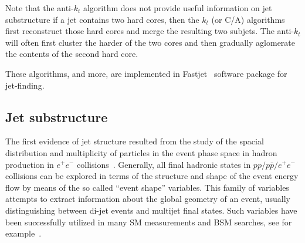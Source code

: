 Note that the anti-$k_t$ algorithm does not provide useful information on jet substructure if a jet contains two hard cores, then the $k_t$ (or C/A) algorithms first reconstruct those hard cores and merge the resulting two subjets. The anti-$k_t$ will often first cluster the harder of the two cores and then gradually aglomerate the contents of the second hard core.

These algorithms, and more, are implemented in {\sc Fastjet}~\cite{fastjet} software package for jet-finding. 


\subsection{Jet substructure}\label{sec:substructure}

The first evidence of jet structure resulted from the study of the spacial distribution and multiplicity of particles in the event phase space in hadron production in $e^+ e^-$ collisions~\cite{PhysRevLett.35.1609}.
Generally, all final hadronic states in $pp/p\bar{p}/e^+e^-$ collisions can be explored in terms of the structure and shape of the event energy flow by means of the so called ``event shape'' variables. This family of variables attempts to extract information about the global geometry of an event, usually distinguishing between di-jet events and multijet final states. Such variables have been successfully utilized in many SM measurements and BSM searches, see for example~\cite{Abbiendi:2007aa,Aad:2012np}. 

